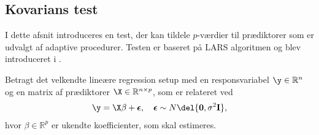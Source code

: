 \subsection{Kovarians test} \label{subsec:kovarians_test}
I dette afsnit introduceres en test, der kan tildele \(p\)-værdier til prædiktorer som er udvalgt af adaptive procedurer.
Testen er baseret på LARS algoritmen og blev introduceret i \citep{lockhart}.

Betragt det velkendte lineære regression setup med en responsvariabel \(\y \in \mathbb{R}^n\) og en matrix af prædiktorer \(\X \in \mathbb{R}^{n \times p}\), som er relateret ved
\begin{align}
\y = \X \beta + \boldsymbol{\epsilon}, \quad \boldsymbol{\epsilon} \sim N\del{\mathbf{0}, \sigma^2 \mathbf{I}}, \label{eq:set-up}
\end{align}
hvor \(\beta \in \mathbb{R}^p\) er ukendte koefficienter, som skal estimeres.

%

